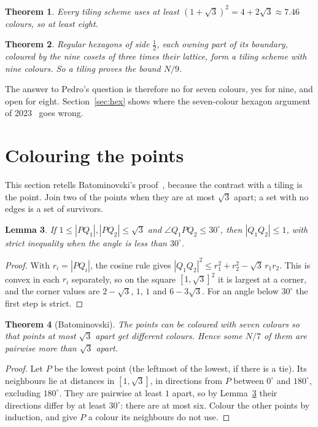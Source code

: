 \documentclass[11pt]{amsart}
\newtheorem{theorem}{Theorem}
\newtheorem{lemma}[theorem]{Lemma}
\theoremstyle{remark}
\begin{document}
\begin{theorem}\label{thm:tiling}
Every tiling scheme uses at least $(1+\sqrt3)^2=4+2\sqrt3\approx7.46$ colours, so at least eight.
\end{theorem}

\begin{theorem}\label{thm:nine}
Regular hexagons of side $\frac12$, each owning part of its boundary, coloured by the nine cosets of three times their lattice, form a tiling scheme with nine colours. So a tiling proves the bound $N/9$.
\end{theorem}

The answer to Pedro's question is therefore no for seven colours, yes for nine, and open for eight. Section~\ref{sec:hex} shows where the seven-colour hexagon argument of 2023~\cite{Rosie} goes wrong.

\section{Colouring the points}\label{sec:points}

This section retells Batominovski's proof~\cite{Bato}, because the contrast with a tiling is the point. Join two of the points when they are at most $\sqrt3$ apart; a set with no edges is a set of survivors.

\begin{lemma}\label{lem:thirty}
If $1\le|PQ_1|,|PQ_2|\le\sqrt3$ and $\angle Q_1PQ_2\le30^\circ$, then $|Q_1Q_2|\le1$, with strict inequality when the angle is less than $30^\circ$.
\end{lemma}

\begin{proof}
With $r_i=|PQ_i|$, the cosine rule gives $|Q_1Q_2|^2\le r_1^2+r_2^2-\sqrt3\,r_1r_2$. This is convex in each $r_i$ separately, so on the square $[1,\sqrt3]^2$ it is largest at a corner, and the corner values are $2-\sqrt3$, $1$, $1$ and $6-3\sqrt3$. For an angle below $30^\circ$ the first step is strict.
\end{proof}

\begin{theorem}[Batominovski]\label{thm:seven}
The points can be coloured with seven colours so that points at most $\sqrt3$ apart get different colours. Hence some $N/7$ of them are pairwise more than $\sqrt3$ apart.
\end{theorem}

\begin{proof}
Let $P$ be the lowest point (the leftmost of the lowest, if there is a tie). Its neighbours lie at distances in $[1,\sqrt3]$, in directions from $P$ between $0^\circ$ and $180^\circ$, excluding $180^\circ$. They are pairwise at least $1$ apart, so by Lemma~\ref{lem:thirty} their directions differ by at least $30^\circ$: there are at most six. Colour the other points by induction, and give $P$ a colour its neighbours do not use.
\end{proof}
\end{document}
